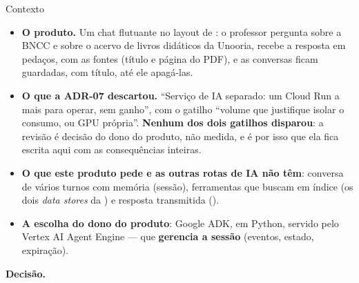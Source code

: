 \begin{especificacao}{Contexto}
\begin{itemize}
  \item \textbf{O produto.} Um chat flutuante no layout de : o
    professor pergunta sobre a BNCC e sobre o acervo de livros didáticos da
    Unooria, recebe a resposta em pedaços, com as fontes (título e página do
    PDF), e as conversas ficam guardadas, com título, até ele apagá-las.
  \item \textbf{O que a ADR-07 descartou.} \enquote{Serviço de IA separado: um
    Cloud Run a mais para operar, sem ganho}, com o gatilho \enquote{volume que
    justifique isolar o consumo, ou GPU própria}. \textbf{Nenhum dos dois gatilhos
    disparou}: a revisão é decisão do dono do produto, não medida, e é por isso
    que ela fica escrita aqui com as consequências inteiras.
  \item \textbf{O que este produto pede e as outras rotas de IA não têm}:
    conversa de vários turnos com memória (sessão), ferramentas que buscam em
    índice (os dois \emph{data stores} da ) e resposta transmitida
    ().
  \item \textbf{A escolha do dono do produto}: Google ADK, em Python, servido
    pelo Vertex AI Agent Engine --- que \textbf{gerencia a sessão} (eventos,
    estado, expiração).
\end{itemize}
\end{especificacao}

\textbf{Decisão.}

